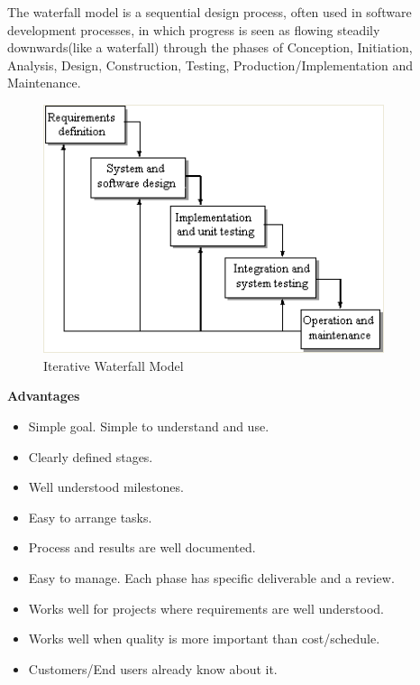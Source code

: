 \documentclass[12pt]{report}
\begin{document}
The waterfall model is a sequential design process, often used in software development 
processes, in which progress is seen as flowing steadily downwards(like a waterfall) through 
the phases of Conception, Initiation, Analysis, Design, Construction, Testing, 
Production/Implementation and Maintenance.
\pagebreak
\begin{figure}[H]
 \centering
 \includegraphics[width=10cm]{./iterative_waterfall_model.png}
 \caption{Iterative Waterfall Model\label{fig:iterative_waterfall_model}}
\end{figure}


\textbf{Advantages}
\begin{itemize}
\item Simple goal. Simple to understand and use. 
\item Clearly defined stages. 
\item Well understood milestones. 
\item Easy to arrange tasks. 
\item Process and results are well documented. 
\item Easy to manage. Each phase has specific deliverable and a review. 
\item Works well for projects where requirements are well understood. 
\item Works well when quality is more important than cost/schedule. 
\item Customers/End users already know about it. 
\end{itemize}
\end{document}
